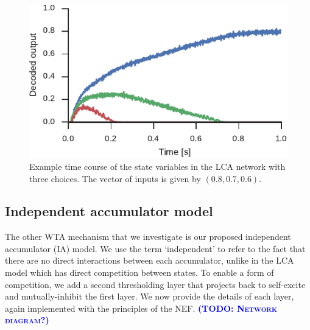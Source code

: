 \documentclass[10pt,letterpaper]{article}
\makeatletter
\newcommand{\todo}[1]{\textbf{\textsc{\textcolor{blue}{(TODO\@: #1)}}}}
\makeatother
\begin{document}
\begin{figure}
    \centering
    \includegraphics{figures/usher-mcclelland}
    \caption{ \label{fig:usher-mcclelland}
        Example time course of the state variables in the LCA network with three choices.
        The vector of inputs is given by $(0.8, 0.7, 0.6)$.
    }
\end{figure}

\subsection{Independent accumulator model}
The other WTA mechanism that we investigate is our proposed independent accumulator (IA) model.
We use the term `independent' to refer to the fact that there are no direct interactions between each accumulator, unlike in the LCA model which has direct competition between states.
To enable a form of competition, we add a second thresholding layer that  projects back to self-excite and mutually-inhibit the first layer.
We now provide the details of each layer, again implemented with the principles of the NEF.
\todo{Network diagram?}
\end{document}
